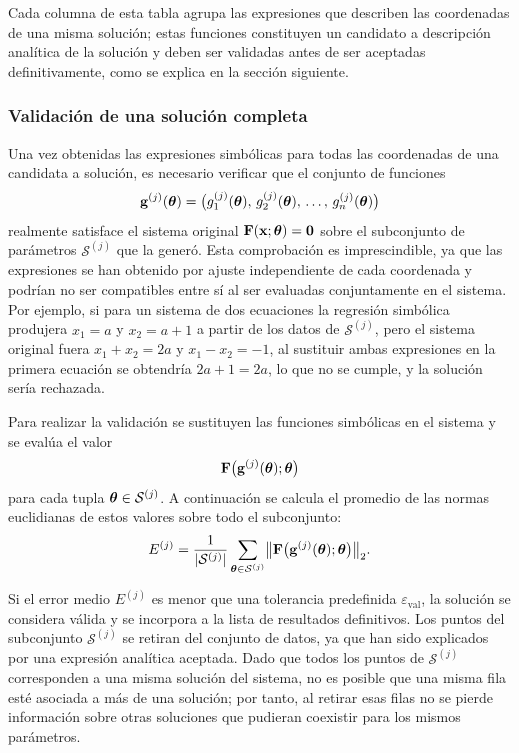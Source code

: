 Cada columna de esta tabla agrupa las expresiones que describen las coordenadas de una misma solución; estas funciones constituyen un candidato a descripción analítica de la solución y deben ser validadas antes de ser aceptadas definitivamente, como se explica en la sección siguiente.

\subsubsection{Validación de una solución completa}
\label{sec:validacion_solucion}

Una vez obtenidas las expresiones simbólicas para todas las coordenadas de una candidata a solución, es necesario verificar que el conjunto de funciones
\[
\mathbf{g}^{(j)}(\boldsymbol{\theta}) = \bigl( g_1^{(j)}(\boldsymbol{\theta}),\, g_2^{(j)}(\boldsymbol{\theta}),\, \dots,\, g_n^{(j)}(\boldsymbol{\theta}) \bigr)
\]
realmente satisface el sistema original \(\mathbf{F}(\mathbf{x}; \boldsymbol{\theta}) = \mathbf{0}\) sobre el subconjunto de parámetros \(\mathcal{S}^{(j)}\) que la generó. Esta comprobación es imprescindible, ya que las expresiones se han obtenido por ajuste independiente de cada coordenada y podrían no ser compatibles entre sí al ser evaluadas conjuntamente en el sistema. Por ejemplo, si para un sistema de dos ecuaciones la regresión simbólica produjera \(x_1 = a\) y
\(x_2 = a + 1\) a partir de los datos de \(\mathcal{S}^{(j)}\), pero
el sistema original fuera \(x_1 + x_2 = 2a\) y \(x_1 - x_2 = -1\), al sustituir ambas expresiones en la primera ecuación se obtendría
\(2a + 1 = 2a\), lo que no se cumple, y la solución sería
rechazada.

Para realizar la validación se sustituyen las funciones simbólicas en el sistema y se evalúa el valor
\[
\mathbf{F}\bigl( \mathbf{g}^{(j)}(\boldsymbol{\theta}); \boldsymbol{\theta} \bigr)
\]
para cada tupla \(\boldsymbol{\theta} \in \mathcal{S}^{(j)}\). A continuación se calcula el promedio de las normas euclidianas de estos valores sobre todo el subconjunto:
\[
E^{(j)} = \frac{1}{|\mathcal{S}^{(j)}|} \sum_{\boldsymbol{\theta} \in \mathcal{S}^{(j)}} \bigl\| \mathbf{F}\bigl( \mathbf{g}^{(j)}(\boldsymbol{\theta}); \boldsymbol{\theta} \bigr) \bigr\|_2.
\]

Si el error medio \(E^{(j)}\) es menor que una tolerancia predefinida
\(\varepsilon_{\text{val}}\), la solución se considera válida y se
incorpora a la lista de resultados definitivos. Los puntos del subconjunto \(\mathcal{S}^{(j)}\) se retiran del conjunto de datos, ya que han sido explicados por una expresión analítica aceptada. Dado que todos los puntos de \(\mathcal{S}^{(j)}\) corresponden a una misma solución del sistema, no es posible que una misma fila esté asociada a más de una solución; por tanto, al retirar esas filas no se pierde información sobre otras soluciones que pudieran coexistir para los mismos parámetros.

